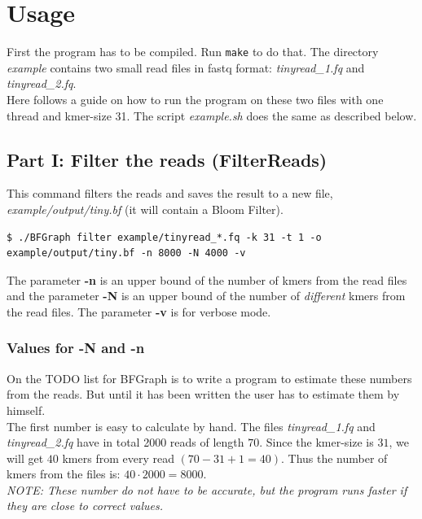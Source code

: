 \documentclass[a4paper]{report}
\renewcommand{\b}[1]{\textbf{#1}}  %
\newcommand{\e}[1]{\emph{#1}}    %
\begin{document}
\chapter{Usage}
First the program has to be compiled. Run {\verb `make` } to do that.
The directory \e{example} contains two small  read files in fastq format: 
\e{tinyread\_1.fq} and \e{tinyread\_2.fq}.\\[4pt]

Here follows a guide on how to run the program on these two files with one thread and kmer-size 31.
The script \e{example.sh} does the same as described below.

\section{Part I: Filter the reads (FilterReads)}
This command filters the reads and saves the result to a new file, \e{example/output/tiny.bf} (it will contain a Bloom Filter).
\begin{verbatim}
$ ./BFGraph filter example/tinyread_*.fq -k 31 -t 1 -o example/output/tiny.bf -n 8000 -N 4000 -v
\end{verbatim}

The parameter \b{-n} is an upper bound of the number of kmers from the read files and the parameter \b{-N} is an upper bound
of the number of \textit{different} kmers from the read files. The parameter \b{-v} is for verbose mode.\\[4pt]

\subsection{Values for -N and -n}  %
On the TODO list for BFGraph is to write a program to estimate these numbers from the reads. But until it has been written the user has to estimate
them by himself. \\[4pt]

The first number is easy to calculate by hand. The files \e{tinyread\_1.fq} and \e{tinyread\_2.fq} have in total 2000 reads of length $70$.
Since the kmer-size is $31$, we will get $40$ kmers from every read $(70 - 31 + 1=40)$. Thus the number of kmers from the files
is: $40\cdot 2000=8000$. \\[4pt]

\textit{NOTE: These number do not have to be accurate, but the program runs faster if they are close to correct values.} \\[4pt]
\end{document}
